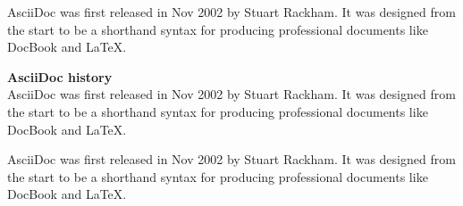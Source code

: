 \begin{sidebar}
AsciiDoc was first released in Nov 2002 by Stuart Rackham.
It was designed from the start to be a shorthand syntax
for producing professional documents like DocBook and LaTeX.
\end{sidebar}

\begin{sidebar}
{\bf AsciiDoc history}
\\
AsciiDoc was first released in Nov 2002 by Stuart Rackham.
It was designed from the start to be a shorthand syntax
for producing professional documents like DocBook and LaTeX.
\end{sidebar}

\begin{sidebar}
\hypertarget{origin}{AsciiDoc was first released in Nov 2002 by Stuart Rackham.
It was designed from the start to be a shorthand syntax
for producing professional documents like DocBook and LaTeX.
}
\end{sidebar}
